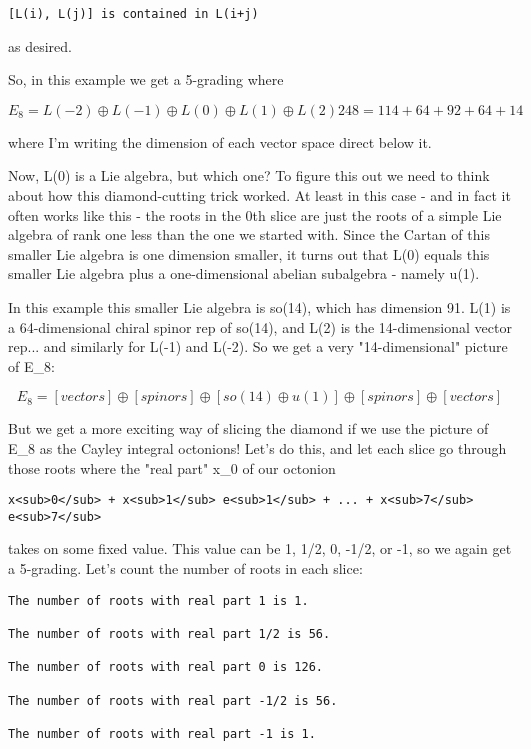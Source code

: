 \begin{verbatim}
[L(i), L(j)] is contained in L(i+j)
\end{verbatim}
    
as desired.  

So, in this example we get a 5-grading where

$$
E_{8} =  L(-2) \oplus  L(-1) \oplus  L(0) \oplus  L(1) \oplus  L(2)
248 =  114  +  64   +  92   +  64  +  14
$$
    
where I'm writing the dimension of each vector space direct below it.

Now, L(0) is a Lie algebra, but which one?  To figure this out we need
to think about how this diamond-cutting trick worked.  At least in this
case - and in fact it often works like this - the roots in the 0th slice
are just the roots of a simple Lie algebra of rank one less than the one
we started with.  Since the Cartan of this smaller Lie algebra is one
dimension smaller, it turns out that L(0) equals this smaller Lie
algebra plus a one-dimensional abelian subalgebra - namely u(1).

In this example this smaller Lie algebra is so(14), which has dimension
91.  L(1) is a 64-dimensional chiral spinor rep of so(14), and L(2) is
the 14-dimensional vector rep... and similarly for L(-1) and L(-2).  
So we get a very "14-dimensional" picture of E_{8}:

$$
E_{8} =  [vectors] \oplus  [spinors] \oplus  [so(14) \oplus  u(1)] \oplus  [spinors] \oplus  [vectors]
$$
    

But we get a more exciting way of slicing the diamond if we use the
picture of E_{8} as the Cayley integral octonions!  Let's do this, and let
each slice go through those roots where the "real part"
x_{0} of our octonion

\begin{verbatim}
x<sub>0</sub> + x<sub>1</sub> e<sub>1</sub> + ... + x<sub>7</sub> e<sub>7</sub>
\end{verbatim}
    
takes on some fixed value.  This value can be 1, 1/2, 0, -1/2,
or -1, so we again get a 5-grading.  Let's count the number of roots in
each slice:

\begin{verbatim}
The number of roots with real part 1 is 1.

The number of roots with real part 1/2 is 56.

The number of roots with real part 0 is 126.

The number of roots with real part -1/2 is 56.

The number of roots with real part -1 is 1.
\end{verbatim}
    
